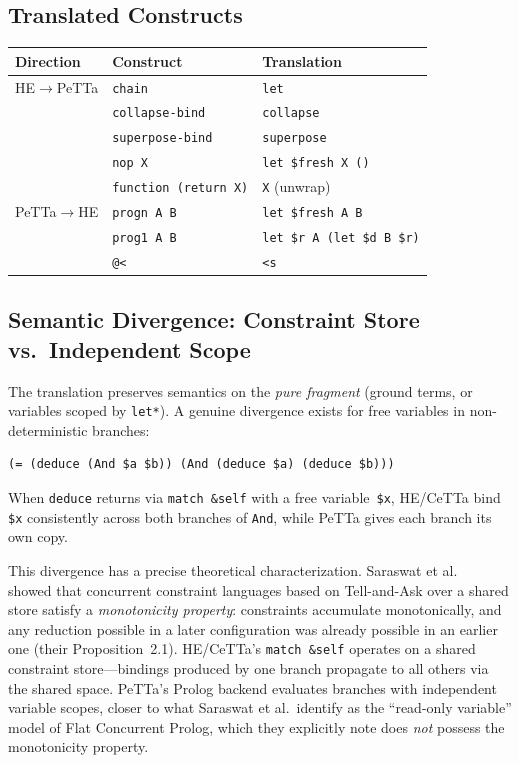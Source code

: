 \documentclass[11pt]{article}
\newcommand{\code}[1]{\texttt{#1}}
\newcommand{\PeTTa}{\textup{PeTTa}}
\newcommand{\HE}{\textup{HE}}
\newcommand{\CeTTa}{\textup{CeTTa}}
\begin{document}
\subsection{Translated Constructs}

\begin{center}
\begin{tabular}{lll}
\toprule
Direction & Construct & Translation \\
\midrule
\HE{}$\to$\PeTTa{} & \code{chain} & \code{let} \\
& \code{collapse-bind} & \code{collapse} \\
& \code{superpose-bind} & \code{superpose} \\
& \code{nop X} & \code{let \$fresh X ()} \\
& \code{function (return X)} & \code{X} (unwrap) \\
\PeTTa{}$\to$\HE{} & \code{progn A B} & \code{let \$fresh A B} \\
& \code{prog1 A B} & \code{let \$r A (let \$d B \$r)} \\
& \code{@<} & \code{<s} \\
\bottomrule
\end{tabular}
\end{center}

\subsection{Semantic Divergence: Constraint Store vs.\ Independent Scope}

The translation preserves semantics on the \emph{pure fragment}
(ground terms, or variables scoped by \code{let*}).  A genuine
divergence exists for free variables in non-deterministic branches:
\begin{lstlisting}[language={},basicstyle=\ttfamily\scriptsize]
(= (deduce (And $a $b)) (And (deduce $a) (deduce $b)))
\end{lstlisting}
When \code{deduce} returns via \code{match \&self} with a free
variable~\code{\$x}, \HE{}/\CeTTa{} bind \code{\$x} consistently
across both branches of \code{And}, while \PeTTa{} gives each branch
its own copy.

This divergence has a precise theoretical characterization.
Saraswat et al.~\cite{saraswat1988} showed that concurrent constraint
languages based on Tell-and-Ask over a shared store satisfy a
\emph{monotonicity property}: constraints accumulate monotonically,
and any reduction possible in a later configuration was already
possible in an earlier one (their Proposition~2.1).  \HE{}/\CeTTa{}'s
\code{match~\&self} operates on a shared constraint store---bindings
produced by one branch propagate to all others via the shared space.
\PeTTa{}'s Prolog backend evaluates branches with independent variable
scopes, closer to what Saraswat et al.\ identify as the
``read-only variable'' model of Flat Concurrent Prolog, which they
explicitly note does \emph{not} possess the monotonicity property.
\end{document}
